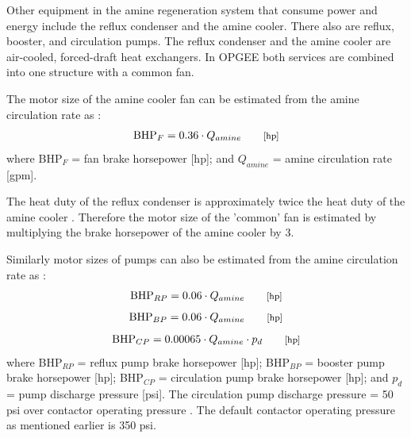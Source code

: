 \documentclass[11pt]{report}
\newcommand{\marg}[1]{{\footnotesize\textit{\textcolor{stanford}{'#1'}}}}
\newcommand{\marginnote}[1]{\marginpar{\marg{#1}}}
\begin{document}
Other equipment in the amine regeneration system that consume power and energy include the reflux condenser and the amine cooler. There also are reflux, booster, and circulation pumps. The reflux condenser and the amine cooler are air-cooled, forced-draft heat exchangers. In OPGEE both services are combined into one structure with a common fan.

The motor size of the amine cooler fan can be estimated from the amine circulation rate as \cite[p. 118]{Manning1991}:
 \marginnote{Surface \\ Processing 2.2.1.3.1}
\begin{equation} \label{eq:BHP_fan}
\text{BHP}_{F} = 0.36\cdot Q_{amine}    \quad\quad \begin{footnotesize}\text{[hp]} \end{footnotesize}
\end{equation}
where BHP$_{F}$ = fan brake horsepower [hp]; and  $Q_{amine}$ = amine circulation rate [gpm].

The heat duty of the reflux condenser is approximately twice the heat duty of the amine cooler \cite[p. 117]{Manning1991}. Therefore the motor size of the 'common' fan is estimated by multiplying the brake horsepower of the amine cooler by 3.

Similarly motor sizes of pumps can also be estimated from the amine circulation rate as \cite[p. 118]{Manning1991}: 
 \marginnote{Surface \\ Processing 2.2.1.2}
\begin{equation} \label{eq:BHP_reflux}
\text{BHP}_{RP}= 0.06 \cdot Q_{amine}   \quad\quad \begin{footnotesize}\text{[hp]} \end{footnotesize}
\end{equation}
\begin{equation} \label{eq:BHP_booster}
\text{BHP}_{BP}= 0.06 \cdot Q_{amine}   \quad\quad \begin{footnotesize}\text{[hp]} \end{footnotesize}
\end{equation}
\begin{equation} \label{eq:BHP_circulation}
\text{BHP}_{CP}=0.00065 \cdot Q_{amine} \cdot p_{d}   \quad\quad \begin{footnotesize}\text{[hp]} \end{footnotesize}
\end{equation}
where BHP$_{RP}$ = reflux pump brake horsepower [hp]; BHP$_{BP}$ = booster pump brake horsepower [hp];  BHP$_{CP}$ = circulation pump brake horsepower [hp]; and $p_{d}$ = pump discharge pressure [psi]. The circulation pump discharge pressure = 50 psi over contactor operating pressure \cite[p. 121]{Manning1991}. The default contactor operating pressure as mentioned earlier is 350 psi. 
\end{document}
